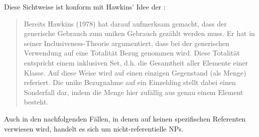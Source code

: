 Diese Sichtweise ist konform mit Hawkins' Idee der :  \blockcquote[43]{Studler2011}{Bereits Hawkins (1978) hat darauf aufmerksam gemacht, dass der generische  Gebrauch zum uniken Gebrauch gezählt werden muss. Er hat in seiner Inclusiveness-Theorie argumentiert, dass bei der generischen  Verwendung auf eine Totalität Bezug genommen wird. Diese Totalität entspricht einem inklusiven Set, d.h. die Gesamtheit
aller Elemente einer Klasse. Auf diese Weise wird auf einen einzigen Gegenstand (als
Menge) referiert. Die unike  Bezugnahme auf ein Einzelding stellt dabei einen Sonderfall
dar, indem die Menge hier zufällig aus genau einem Element besteht.} 



Auch in den nachfolgenden Fällen, in denen  auf keinen spezifischen Referenten  verwiesen wird, handelt es sich um nicht-referentielle   NPs. 

